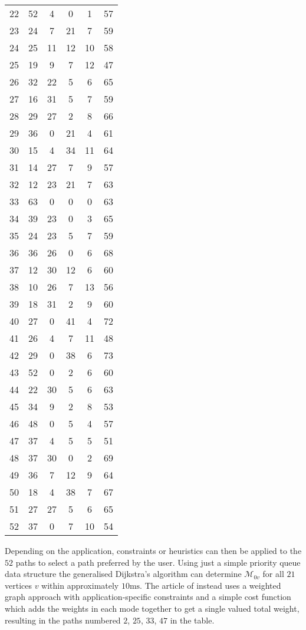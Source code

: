 \documentclass[preprint,authoryear,12pt]{elsarticle}
\begin{document}
\begin{table}
\begin{center}
\begin{scriptsize}
\begin{tabular}{|c|cccc|c|}
 22 & 52 & 4  & 0  & 1  & 57 \\
 23 & 24 & 7  & 21 & 7  & 59 \\
 24 & 25 & 11 & 12 & 10 & 58 \\
 25 & 19 & 9  & 7  & 12 & 47 \\
 26 & 32 & 22 & 5  & 6  & 65 \\
 27 & 16 & 31 & 5  & 7  & 59 \\
 28 & 29 & 27 & 2  & 8  & 66 \\
 29 & 36 & 0  & 21 & 4  & 61 \\
 30 & 15 & 4  & 34 & 11 & 64 \\
 31 & 14 & 27 & 7  & 9  & 57 \\
 32 & 12 & 23 & 21 & 7  & 63 \\
 33 & 63 & 0  & 0  & 0  & 63 \\
 34 & 39 & 23 & 0  & 3  & 65 \\
 35 & 24 & 23 & 5  & 7  & 59 \\
 36 & 36 & 26 & 0  & 6  & 68 \\
 37 & 12 & 30 & 12 & 6  & 60 \\
 38 & 10 & 26 & 7  & 13 & 56 \\
 39 & 18 & 31 & 2  & 9  & 60 \\
 40 & 27 & 0  & 41 & 4  & 72 \\
 41 & 26 & 4  & 7  & 11 & 48 \\
 42 & 29 & 0  & 38 & 6  & 73 \\
 43 & 52 & 0  & 2  & 6  & 60 \\
 44 & 22 & 30 & 5  & 6  & 63 \\
 45 & 34 & 9  & 2  & 8  & 53 \\
 46 & 48 & 0  & 5  & 4  & 57 \\
 47 & 37 & 4  & 5  & 5  & 51 \\
 48 & 37 & 30 & 0  & 2  & 69 \\
 49 & 36 & 7  & 12 & 9  & 64 \\
 50 & 18 & 4  & 38 & 7  & 67 \\
 51 & 27 & 27 & 5  & 6  & 65 \\
 52 & 37 & 0  & 7  & 10 & 54 \\
 \hline
\end{tabular}
\end{scriptsize}\end{center}
\end{table}
Depending on the application, constraints or heuristics can then be applied to
the $52$ paths to select a path preferred by the user.
Using just a simple priority queue data structure the generalised
Dijkstra's algorithm can determine $\mathcal{M}_{0v}$ for all $21$ vertices $v$
within approximately $10\mbox{ms}$.
The article of \cite{Lozano2001} instead uses a weighted graph approach with
application-specific constraints and a simple cost function which adds the
weights in each mode together to get a single valued total weight,
resulting in the paths numbered $2$, $25$, $33$, $47$ in the table.
\end{document}
